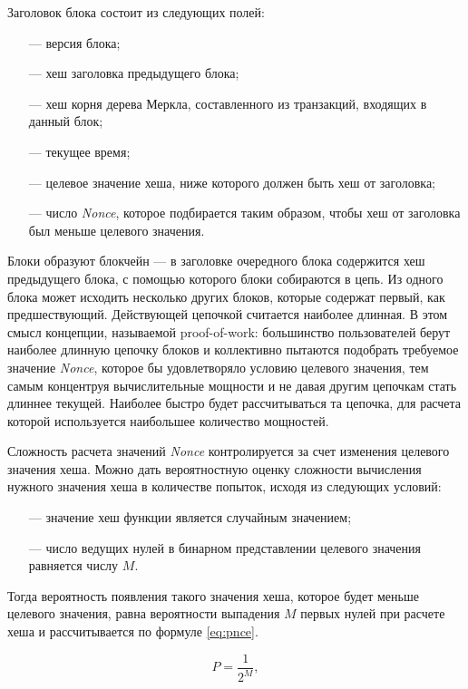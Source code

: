 Заголовок блока состоит из следующих полей:
\begin{itemize}
	\item[---] версия блока;
	\item[---] хеш заголовка предыдущего блока;
	\item[---] хеш корня дерева Меркла, составленного из транзакций, входящих в данный блок;
	\item[---] текущее время;
	\item[---] целевое значение хеша, ниже которого должен быть хеш от заголовка;
	\item[---] число \textit{Nonce}, которое подбирается таким образом, чтобы хеш от заголовка был меньше целевого значения.
\end{itemize}

Блоки образуют блокчейн --- в заголовке очередного блока содержится хеш предыдущего блока, с помощью которого блоки собираются в цепь. Из одного блока может исходить несколько других блоков, которые содержат первый, как предшествующий. Действующей цепочкой считается наиболее длинная. В этом смысл концепции, называемой proof-of-work: большинство пользователей берут наиболее длинную цепочку блоков и коллективно пытаются подобрать требуемое значение \textit{Nonce}, которое бы удовлетворяло условию целевого значения, тем самым концентруя вычислительные мощности и не давая другим цепочкам стать длиннее текущей. Наиболее быстро будет рассчитываться та цепочка, для расчета которой используется наибольшее количество мощностей.

Сложность расчета значений \textit{Nonce} контролируется за счет изменения целевого значения хеша. Можно дать вероятностную оценку сложности вычисления нужного значения хеша в количестве попыток, исходя из следующих условий:
\begin{itemize}
	\item[---] значение хеш функции является случайным значением;
	\item[---] число ведущих нулей в бинарном представлении целевого значения равняется числу $M$.
\end{itemize}

Тогда вероятность появления такого значения хеша, которое будет меньше целевого значения, равна вероятности выпадения $M$ первых нулей при расчете хеша и рассчитывается по формуле \ref{eq:pnce}.

\begin{equation}
\label{eq:pnce}
P = \frac{1}{2^M},
\end{equation}

